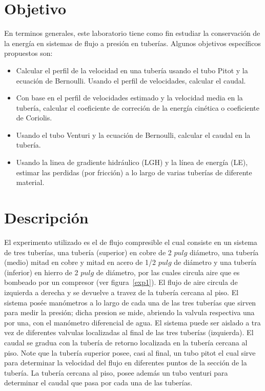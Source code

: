 \documentclass[10pt, a4paper]{exam}
\begin{document}
\section{Objetivo}
En terminos generales, este laboratorio tiene como fin estudiar la conservaci\'on de la energ\'ia en sistemas de flujo a presi\'on en tuber\'ias. Algunos objetivos espec\'ificos propuestos son:
\begin{itemize}
\item Calcular el perfil de la velocidad en una tuber\'ia usando el tubo Pitot y la ecuaci\'on de Bernoulli. Usando el perfil de velocidades, calcular el caudal. 
\item Con base en el perfil de velocidades estimado y la velocidad media en la tuber\'ia, calcular el coeficiente de correci\'on de la energ\'ia cin\'etica o coeficiente de Coriolis.
\item Usando el tubo Venturi y la ecuaci\'on de Bernoulli, calcular el caudal en la tuber\'ia. 
\item Usando la linea de gradiente hidr\'aulico (LGH) y la l\'inea de energ\'ia (LE), estimar las perdidas (por fricci\'on) a lo largo de varias tuber\'ias de diferente material. 
\end{itemize}

\section{Descripci\'on}
El experimento utilizado es el de flujo compresible el cual consiste en un sistema de tres tuber\'ias, una tuber\'ia (superior) en cobre de 2 $pulg$ di\'ametro, una tuber\'ia (medio) mitad en cobre y mitad en acero de 1/2 $pulg$ de di\'ametro y una tuber\'ia (inferior) en hierro de 2 $pulg$ de di\'ametro, por las cuales circula aire que es bombeado por un compresor (ver figura~\ref{exp1}). El flujo de aire circula de izquierda a derecha y se devuelve a travez de la tuber\'ia cercana al piso. El sistema pos\'ee man\'ometros a lo largo de cada una de las tres tuber\'ias que sirven para medir la presi\'on; dicha presion se mide, abriendo la valvula respectiva una por una, con el man\'ometro diferencial de agua. El sistema puede ser aislado a tra vez de diferentes valvulas localizadas al final de las tres tuber\'ias (izquierda). El caudal se gradua con la tuber\'ia de retorno localizada en la tuber\'ia cercana al piso. Note que la tuber\'ia superior posee, casi al final, un tubo pitot el cual sirve para determinar la velocidad del flujo en diferentes puntos de la secci\'on de la tuber\'ia. La tuber\'ia cercana al piso, posee adem\'as un tubo venturi para determinar el caudal que pasa por cada una de las tuber\'ias.   
\end{document}
